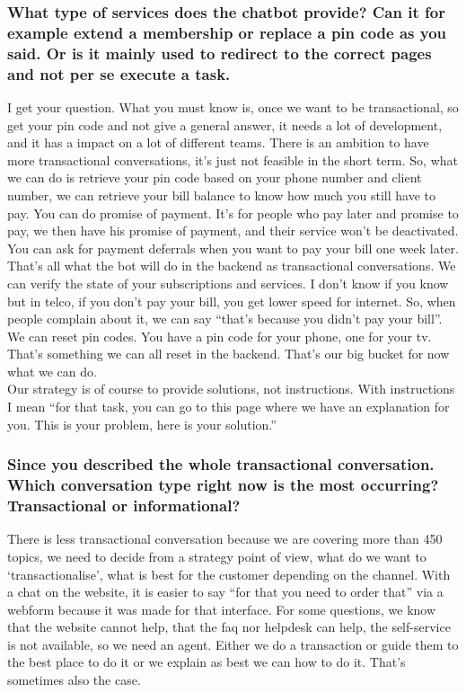 \begin{appendices}
	\subsubsection{What type of services does the chatbot provide? Can it for example extend a membership or replace a pin code as you said. Or is it mainly used to redirect to the correct pages and not per se execute a task.}
	I get your question. What you must know is, once we want to be transactional, so get your pin code and not give a general answer, it needs a lot of development, and it has a impact on a lot of different teams. There is an ambition to have more transactional conversations, it’s just not feasible in the short term. So, what we can do is retrieve your pin code based on your phone number and client number, we can retrieve your bill balance to know how much you still have to pay. You can do promise of payment. It’s for people who pay later and promise to pay, we then have his promise of payment, and their service won’t be deactivated. You can ask for payment deferrals when you want to pay your bill one week later. That’s all what the bot will do in the backend as transactional conversations. We can verify the state of your subscriptions and services. I don’t know if you know but in telco, if you don’t pay your bill, you get lower speed for internet. So, when people complain about it, we can say “that’s because you didn’t pay your bill”. We can reset pin codes. You have a pin code for your phone, one for your tv. That’s something we can all reset in the backend. That’s our big bucket for now what we can do.\\
	Our strategy is of course to provide solutions, not instructions. With instructions I mean “for that task, you can go to this page where we have an explanation for you. This is your problem, here is your solution.”
	
	\subsubsection{Since you described the whole transactional conversation. Which conversation type right now is the most occurring? Transactional or informational?}
	There is less transactional conversation because we are covering more than 450 topics, we need to decide from a strategy point of view, what do we want to ‘transactionalise’, what is best for the customer depending on the channel. With a chat on the website, it is easier to say “for that you need to order that” via a webform because it was made for that interface. For some questions, we know that the website cannot help, that the \acrshort{faq} nor helpdesk can help, the self-service is not available, so we need an agent. Either we do a transaction or guide them to the best place to do it or we explain as best we can how to do it. That’s sometimes also the case.
	

\end{appendices}
